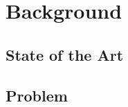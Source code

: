 \chapter{Background}
\label{sec:background}


\section{State of the Art}

\section{Problem}\label{sec:problem}




